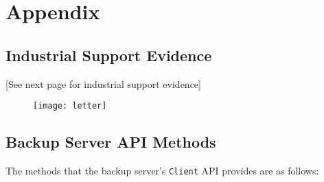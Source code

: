 \newpage

\chapter{Appendix}

\section{Industrial Support Evidence}
\label{sec:appendix-industrial-support}

\phantom{a}
\vfill
\begin{center}
[See next page for industrial support evidence]
\end{center}
\vfill

\cleardoublepage


\begin{figure}[H]
\thispagestyle{plain}
\centering
\hspace{-1cm}
\texttt{[image: letter]}
\end{figure}

\cleardoublepage

\section{Backup Server API Methods}
\label{sec:appendix-server-api}

The methods that the backup server's \verb!Client! API provides are as follows:

